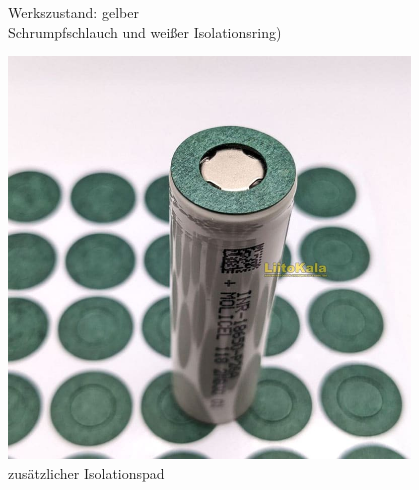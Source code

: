 \documentclass[handout, usenames,dvipsnames, nosymbols,aspectratio=169]{beamer}
\begin{document}
\begin{frame}
\begin{minipage}{0.35\textwidth}
			Werkszustand: gelber\\
			Schrumpfschlauch und weißer Isolationsring)
		\end{minipage}
		\begin{minipage}{0.3\textwidth}
			\centering
			\includegraphics[width=0.8\textwidth]{images/isolated-ring-18650-2.jpg}\\
			zusätzlicher Isolationspad
		\end{minipage}
	\end{frame}
	
\end{document}
